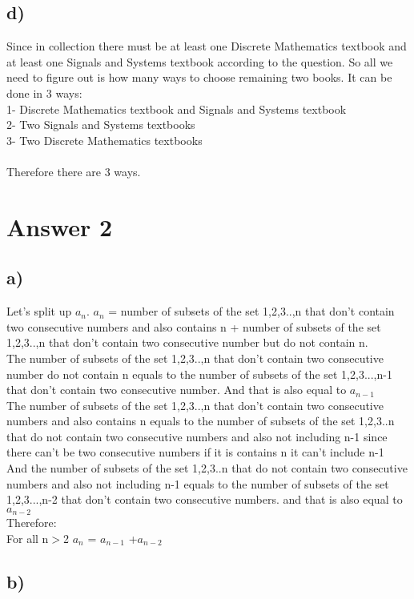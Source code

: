 \documentclass[12pt]{article}
\begin{document}
\subsection*{d)}
Since in collection there must be at least one Discrete Mathematics textbook and at least one Signals and Systems textbook according to the question. So all we need to figure out is how many ways to choose remaining two books. It can be done in 3 ways:\\
1- Discrete Mathematics textbook and Signals and Systems textbook\\
2- Two Signals and Systems textbooks\\
3- Two Discrete Mathematics textbooks\\
\\Therefore there are 3 ways.


\section*{Answer 2}
\subsection*{a)}
Let's split up $a_n$. $a_n$  = number of subsets of the set {1,2,3..,n} that don't contain two consecutive numbers and also contains n +  number of subsets of the set {1,2,3..,n} that don't contain two consecutive number but do not contain n.\\
The number of subsets of the set {1,2,3..,n} that don't contain two consecutive number do not contain n equals to the number of subsets of the set {1,2,3...,n-1} that don't contain two consecutive number. And that is also equal to $a_{n-1}$  \\
The number of subsets of the set {1,2,3..,n} that don't contain two consecutive numbers and also contains n equals to the number of subsets of the set {1,2,3..n} that do not contain two consecutive numbers and also not including n-1 since there can't be two consecutive numbers if it is contains n it can't include n-1\\
And the number of subsets of the set {1,2,3..n} that do not contain two consecutive numbers and also not including n-1  equals to the number of subsets of the set {1,2,3...,n-2} that don't contain two consecutive numbers. and that is also equal to $a_{n-2}$ \\
Therefore:\\
For all n$>$2  $a_{n}$ = $a_{n-1}$ +$a_{n-2}$
\subsection*{b)}
\end{document}
